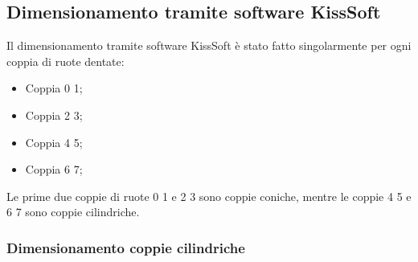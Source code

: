 \subsection{Dimensionamento tramite software KissSoft}
Il dimensionamento tramite software KissSoft è stato fatto singolarmente per ogni coppia di ruote dentate: 
\begin{itemize}
    \item Coppia 0 1;
    \item Coppia 2 3;
    \item Coppia 4 5;
    \item Coppia 6 7;
\end{itemize}
Le prime due coppie di ruote 0 1 e 2 3 sono coppie coniche, mentre le coppie 4 5 e 6 7 sono coppie cilindriche. 
\subsubsection{Dimensionamento coppie cilindriche}
